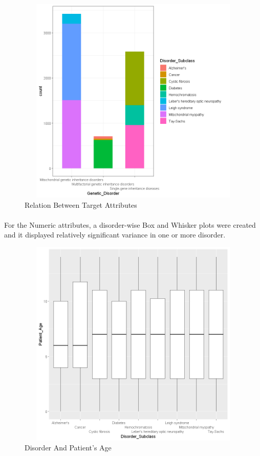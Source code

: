 \begin{figure}[htpb]
	\centering
	\includegraphics[height=10cm, width=12cm]{figures/rel.png}
	\caption{Relation Between Target Attributes }
	\label{fig 17}
\end{figure}
\paragraph{}

\noindent
\noindent
For the Numeric attributes, a disorder-wise Box and Whisker plots were created and it displayed relatively significant variance in one or more disorder.


\begin{figure}[htpb]
	\centering
	\includegraphics[height=10cm, width=12cm]{figures/p-age.png}
	\caption{Disorder And Patient's Age}
	\label{fig 18}
\end{figure}

